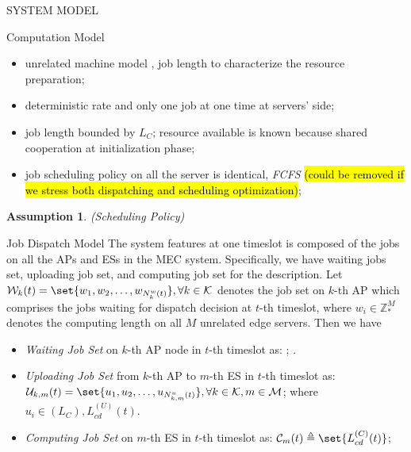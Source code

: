 \documentclass[10pt, conference, letterpaper]{IEEEtran}
\newtheorem{assumption}{Assumption}
\newcommand{\domZ}{\mathbb{Z}_{*}}
\DeclarePairedDelimiter\set\{\}
\newcommand{\apSet}{\mathcal{K}}
\newcommand{\esSet}{\mathcal{M}}
\newcommand{\wSet}{\mathcal{W}}
\newcommand{\uSet}{\mathcal{U}}
\newcommand{\cSet}{\mathcal{C}}
\begin{document}
\begin{section}{SYSTEM MODEL}
        \begin{subsection}{Computation Model}
            \begin{itemize}
                \item unrelated machine model \cite{tan-online}, job length to characterize the resource preparation;
                \item deterministic rate and only one job at one time at servers' side;
                \item job length bounded by $L_C$; resource available is known because shared cooperation at initialization phase;
                \item job scheduling policy on all the server is identical, \emph{FCFS} \hl{(could be removed if we stress both dispatching and scheduling optimization)};
            \end{itemize}
            \begin{assumption}
                (Scheduling Policy)
            \end{assumption}
        \end{subsection}

        \begin{subsection}{Job Dispatch Model}
            The system features at one timeslot is composed of the jobs on all the APs and ESs in the MEC system. Specifically, we have waiting jobs set, uploading job set, and computing job set for the description.
            Let $\wSet_{k}(t) = \set{w_1, w_2, \dots, w_{N^w_k(t)}}, \forall k \in \apSet$ denotes the job set on $k$-th AP which comprises the jobs waiting for dispatch decision at $t$-th timeslot, where $w_i \in \domZ^M$ denotes the computing length on all $M$ unrelated edge servers. Then we have 
            \begin{itemize}
                \item \emph{Waiting Job Set} on $k$-th AP node in $t$-th timeslot as: ; .
                \item \emph{Uploading Job Set} from $k$-th AP to $m$-th ES in $t$-th timeslot as: $\uSet_{k,m}(t) = \set{u_1, u_2, \dots, u_{N^u_{k,m}(t)}}, \forall k \in \apSet, m \in \esSet$; where $u_i \in (L_C), L_{cd}^{(U)}(t)$.
                \item \emph{Computing Job Set} on $m$-th ES in $t$-th timeslot as: $\cSet_{m}(t) \triangleq \set{L_{cd}^{(C)}(t)}$;
            \end{itemize}


\end{subsection}
\end{section}
\end{document}
